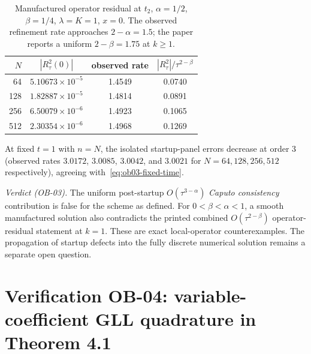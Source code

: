 \documentclass[11pt,a4paper]{amsart}
\theoremstyle{remark}
\theoremstyle{plain}
\theoremstyle{remark}
\numberwithin{equation}{section}
\begin{document}
\begin{table}[ht]
\centering
\caption{Manufactured operator residual at $t_2$, $\alpha=1/2$, $\beta=1/4$, $\lambda=K=1$, $x=0$. The observed refinement rate approaches $2-\alpha=1.5$; the paper reports a uniform $2-\beta=1.75$ at $k\ge1$.}
\label{tab:ob03-residual}
\small
\begin{tabular}{@{}rccc@{}}\hline
$N$ & $|R_\tau^2(0)|$ & observed rate & $|R_\tau^2|/\tau^{2-\beta}$ \\\hline
64 & $5.10673\times10^{-5}$ & 1.4549 & 0.0740\\
128 & $1.82887\times10^{-5}$ & 1.4814 & 0.0891\\
256 & $6.50079\times10^{-6}$ & 1.4923 & 0.1065\\
512 & $2.30354\times10^{-6}$ & 1.4968 & 0.1269\\\hline
\end{tabular}
\end{table}
At fixed $t=1$ with $n=N$, the isolated startup-panel errors decrease at order $3$ (observed rates $3.0172$, $3.0085$, $3.0042$, and $3.0021$ for $N=64,128,256,512$ respectively), agreeing with~\eqref{eq:ob03-fixed-time}.

\noindent\emph{Verdict (OB-03).} The uniform post-startup $O(\tau^{3-\alpha})$ \emph{Caputo consistency} contribution is false for the scheme as defined. For $0<\beta<\alpha<1$, a smooth manufactured solution also contradicts the printed combined $O(\tau^{2-\beta})$ operator-residual statement at $k=1$. These are exact local-operator counterexamples. The propagation of startup defects into the fully discrete numerical solution remains a separate open question.

\section{Verification OB-04: variable-coefficient GLL quadrature in Theorem 4.1}
\label{sec:ob04-gll}
\end{document}
